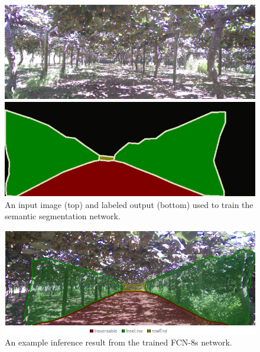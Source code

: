 \documentclass[preprint,authoryear,12pt]{elsarticle}
\begin{document}
        \begin{figure}[htb]
            \centering
            \includegraphics[width=\linewidth]{imgs/photos/segImgLabelPair_trimmed.png}
            \caption{
                An input image (top) and labeled output (bottom) used to train the semantic segmentation network.
            }
            \label{fig:segImgLabelPair}
        \end{figure}

        \begin{figure}[htb]
            \centering
            \includegraphics[width=\linewidth]{imgs/photos/semSegRowResults.png}
            \caption{
                An example inference result from the trained FCN-8s network.
            }
            \label{fig:semSegRowResults}
        \end{figure}
\end{document}
